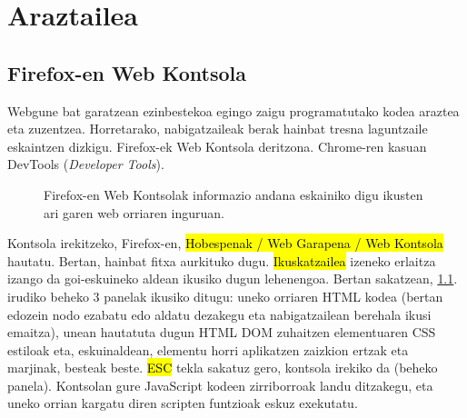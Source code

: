 \chapter{Araztailea}\label{sec:webkontsola}

\section{Firefox-en Web Kontsola}

Webgune bat garatzean ezinbestekoa egingo zaigu programatutako kodea araztea eta zuzentzea. Horretarako, nabigatzaileak berak hainbat tresna laguntzaile eskaintzen dizkigu. Firefox-ek Web Kontsola deritzona. Chrome-ren kasuan DevTools (\textit{Developer Tools}).

\begin{figure}[ht]
	\centering
{}
\caption{Firefox-en Web Kontsolak informazio andana eskainiko digu ikusten ari garen web orriaren inguruan.}
\label{fig:webkontsola}
\end{figure}

Kontsola irekitzeko, Firefox-en, \hl{Hobespenak / Web Garapena / Web Kontsola} hautatu. Bertan, hainbat fitxa aurkituko dugu. \hl{Ikuskatzailea} izeneko erlaitza izango da goi-eskuineko aldean ikusiko dugun lehenengoa. Bertan sakatzean,  \ref{fig:webkontsola}. irudiko beheko 3 panelak ikusiko ditugu: uneko orriaren HTML kodea (bertan edozein nodo ezabatu edo aldatu dezakegu eta nabigatzailean berehala ikusi emaitza), unean hautatuta dugun HTML DOM zuhaitzen elementuaren CSS estiloak eta, eskuinaldean, elementu horri aplikatzen zaizkion ertzak eta marjinak, besteak beste. \hl{ESC} tekla sakatuz gero, kontsola irekiko da (beheko panela). Kontsolan gure JavaScript kodeen zirriborroak landu ditzakegu, eta uneko orrian kargatu diren scripten funtzioak eskuz exekutatu.

